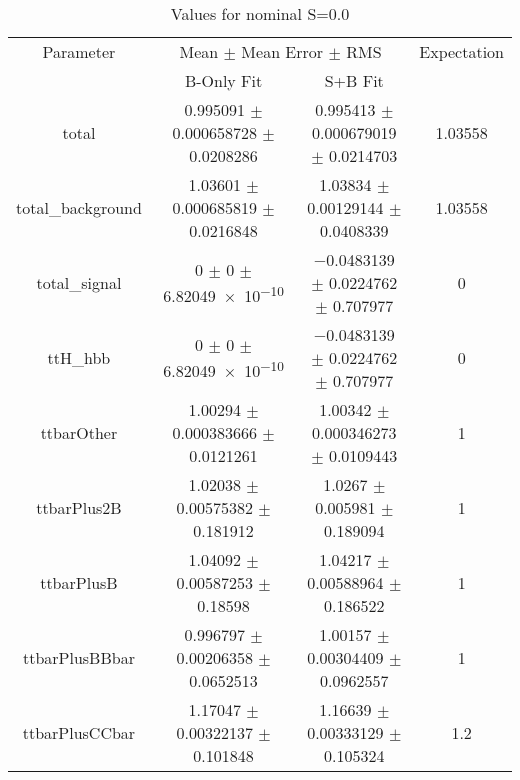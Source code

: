 \begin{table}
\centering
\caption{Values for nominal S=0.0}
\begin{tabular}{cccc}
\toprule
Parameter & \multicolumn{2}{c}{Mean $\pm$ Mean Error $\pm$ RMS} & Expectation\\
 & B-Only Fit & S+B Fit & \\
\midrule
total & \num{0.995091} $\pm$ \num{0.000658728} $\pm$ \num{0.0208286} & \num{0.995413} $\pm$ \num{0.000679019} $\pm$ \num{0.0214703} & \num{1.03558}\\
total\_background & \num{1.03601} $\pm$ \num{0.000685819} $\pm$ \num{0.0216848} & \num{1.03834} $\pm$ \num{0.00129144} $\pm$ \num{0.0408339} & \num{1.03558}\\
total\_signal & \num{0} $\pm$ \num{0} $\pm$ \num{6.82049e-10} & \num{-0.0483139} $\pm$ \num{0.0224762} $\pm$ \num{0.707977} & \num{0}\\
ttH\_hbb & \num{0} $\pm$ \num{0} $\pm$ \num{6.82049e-10} & \num{-0.0483139} $\pm$ \num{0.0224762} $\pm$ \num{0.707977} & \num{0}\\
ttbarOther & \num{1.00294} $\pm$ \num{0.000383666} $\pm$ \num{0.0121261} & \num{1.00342} $\pm$ \num{0.000346273} $\pm$ \num{0.0109443} & \num{1}\\
ttbarPlus2B & \num{1.02038} $\pm$ \num{0.00575382} $\pm$ \num{0.181912} & \num{1.0267} $\pm$ \num{0.005981} $\pm$ \num{0.189094} & \num{1}\\
ttbarPlusB & \num{1.04092} $\pm$ \num{0.00587253} $\pm$ \num{0.18598} & \num{1.04217} $\pm$ \num{0.00588964} $\pm$ \num{0.186522} & \num{1}\\
ttbarPlusBBbar & \num{0.996797} $\pm$ \num{0.00206358} $\pm$ \num{0.0652513} & \num{1.00157} $\pm$ \num{0.00304409} $\pm$ \num{0.0962557} & \num{1}\\
ttbarPlusCCbar & \num{1.17047} $\pm$ \num{0.00322137} $\pm$ \num{0.101848} & \num{1.16639} $\pm$ \num{0.00333129} $\pm$ \num{0.105324} & \num{1.2}\\
\bottomrule
\end{tabular}
\end{table}